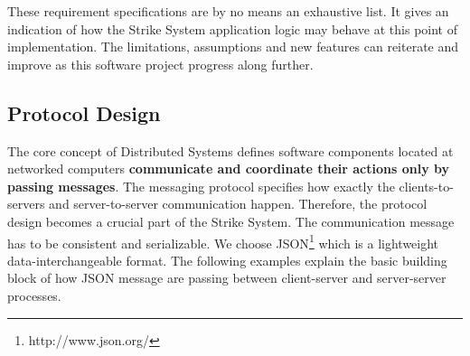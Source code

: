 \documentclass[dareport.tex]{subfiles}
\begin{document}
These requirement specifications are by no means an exhaustive list. It gives an indication of how the Strike System application logic may behave at this point of implementation. The limitations, assumptions and new features can reiterate and improve as this software project progress along further.

\subsection{Protocol Design}
The core concept of Distributed Systems defines software components 
located at networked computers \textbf{communicate and coordinate their actions only by passing messages}\cite{coulouris}. The messaging protocol specifies how exactly the clients-to-servers and server-to-server communication happen. Therefore, the protocol design becomes a crucial part of the Strike System. The communication message has to be consistent and serializable. We choose JSON\footnote{http://www.json.org/} which is a lightweight data-interchangeable format. The following examples explain the basic building block of how JSON message are passing between client-server and server-server processes.
\end{document}
